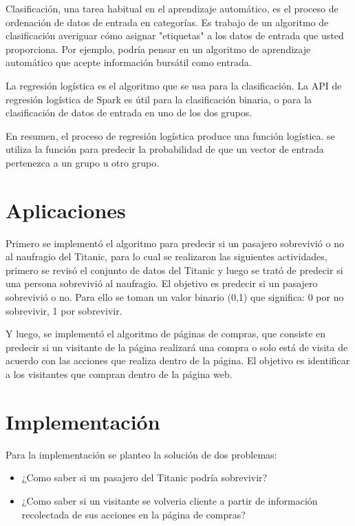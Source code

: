 \documentclass{article}
\begin{document}
Clasificación, una tarea habitual en el aprendizaje automático, es el proceso de ordenación de datos de entrada en categorías. Es trabajo de un algoritmo de clasificación averiguar cómo asignar "etiquetas" a los datos de entrada que usted proporciona. Por ejemplo, podría pensar en un algoritmo de aprendizaje automático que acepte información bursátil como entrada. 

La regresión logística es el algoritmo que se usa para la clasificación. La API de regresión logística de Spark es útil para la clasificación binaria, o para la clasificación de datos de entrada en uno de los dos grupos. 

En resumen, el proceso de regresión logística produce una función logística. se utiliza la función para predecir la probabilidad de que un vector de entrada pertenezca a un grupo u otro grupo.


\section{Aplicaciones}

Primero se implementó el algoritmo para predecir si un pasajero sobrevivió o no al naufragio del Titanic, para lo cual se realizaron las siguientes actividades, primero se revisó el conjunto de datos del Titanic y luego se trató de predecir si una persona sobrevivió al naufragio. El objetivo es predecir si un pasajero sobrevivió o no. Para ello se toman un valor binario (0,1) que significa: 0 por no sobrevivir, 1 por sobrevivir.

Y luego, se implementó el algoritmo de páginas de compras, que consiste en predecir si un visitante de la página realizará una compra o solo está de visita de acuerdo con las acciones que realiza dentro de la página. El objetivo es identificar a los visitantes que compran dentro de la página web.


\section{Implementación}

Para la implementación se planteo la solución de dos problemas:
\begin{itemize}
    \item ¿Como saber si un pasajero del Titanic podría sobrevivir?
    \item ¿Como saber si un visitante se volveria cliente a partir de información recolectada de sus acciones en la página de compras?
\end{itemize}
\end{document}
